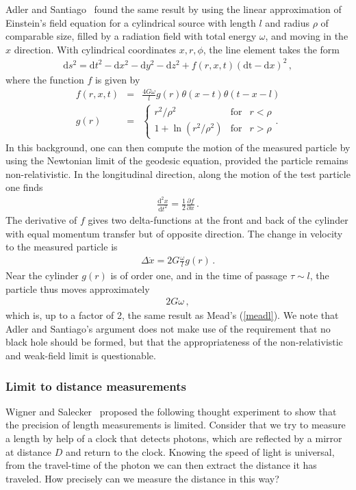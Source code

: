 \documentclass{article}
\def\beqn{\begin{eqnarray}}
\def\eeqn{\end{eqnarray}}
\begin{document}
Adler and Santiago~\cite{Adler} found the same result by using the linear approximation of Einstein's field equation for
a cylindrical source with length $l$ and radius $\rho$ of comparable size, filled by a radiation field with 
total energy $\omega$, and moving in the $x$ direction. With cylindrical coordinates $x,r,\phi$, the line element takes
the form ~\cite{Adler} 
\beqn
\mathrm{d}s^2 = \mathrm{d}t^2 - \mathrm{d}x^2 - \mathrm{d}y^2 - \mathrm{d}z^2 + f(r,x,t) (\mathrm{dt} -\mathrm{d}x)^2  \,, \label{adlermetric}
\eeqn 
where the function $f$ is given by
\beqn
f(r,x,t) &=& \frac{4 G \omega}{l} g(r) \theta(x-t) \theta(t-x-l) \\
g(r) &=& \left\{ 
\begin{array}{lll} 
r^2/\rho^2 & {\mbox{for}} & r< \rho \\
1 + \ln( r^2/\rho^2) & {\mbox{for}} & r> \rho
\end{array} .
\right. 
\eeqn
In this background, one can then compute the motion of the measured particle by using the Newtonian limit of
the geodesic equation, provided the particle remains non-relativistic. In the longitudinal direction,
along the motion of the test particle one finds
\beqn
\frac{\mathrm{d}^2 x}{\mathrm{d}t^2} = \frac{1}{2} \frac{\partial f}{\partial x} \,.
\eeqn
The derivative of $f$ gives two delta-functions at the front and back of the cylinder with equal momentum transfer but of
opposite direction. The change in velocity to the measured particle is
\beqn
\Delta \dot x = 2 G \frac{\omega}{l} g(r) \,.
\eeqn
Near the cylinder $g(r)$ is of order one, and in the time of passage $\tau \sim l$, the particle thus moves approximately
\beqn
2 G \omega \,,
\eeqn
which is, up to a factor of 2, the same result as Mead's (\ref{meadl}). 
We note that Adler and Santiago's argument does not make use of the requirement that 
no black hole should be formed, but that the appropriateness of the 
non-relativistic and weak-field limit is
questionable. 


\subsubsection{Limit to distance measurements}
\label{Wigner}

Wigner and Salecker~\cite{Salecker:1957be} proposed the following thought experiment to show that the precision of length measurements 
is limited. Consider that we try to measure a length by help of a clock that detects photons, which are reflected 
by a mirror at distance $D$ and return to the clock. Knowing the speed of light is universal, from the travel-time of the 
photon we can then extract the distance it has traveled. 
How precisely can we measure the distance in this way? 
\end{document}
